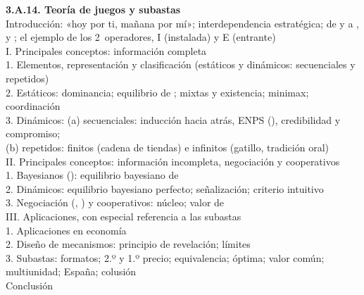 \documentclass[11pt]{article}
\begin{document}
\newpage
\begin{esquema}
\textbf{3.A.14. Teoría de juegos y subastas}\\[2pt]
Introducción: «hoy por ti, mañana por mí»; interdependencia estratégica; de  y  a ,  y ; el ejemplo de los 2~operadores, \textup{I} (instalada) y E (entrante)\\
I. Principales conceptos: información completa\\
\hspace*{1.5em}1. Elementos, representación y clasificación (estáticos y dinámicos: secuenciales y repetidos)\\
\hspace*{1.5em}2. Estáticos: dominancia; equilibrio de ; mixtas y existencia; minimax; coordinación\\
\hspace*{1.5em}3. Dinámicos: (a) secuenciales: inducción hacia atrás, ENPS (), credibilidad y compromiso;\\
\hspace*{3em}(b) repetidos: finitos (cadena de tiendas) e infinitos (gatillo, tradición oral)\\
II. Principales conceptos: información incompleta, negociación y cooperativos\\
\hspace*{1.5em}1. Bayesianos (): equilibrio bayesiano de \\
\hspace*{1.5em}2. Dinámicos: equilibrio bayesiano perfecto; señalización; criterio intuitivo\\
\hspace*{1.5em}3. Negociación (, ) y cooperativos: núcleo; valor de \\
III. Aplicaciones, con especial referencia a las subastas\\
\hspace*{1.5em}1. Aplicaciones en economía\\
\hspace*{1.5em}2. Diseño de mecanismos: principio de revelación; límites\\
\hspace*{1.5em}3. Subastas: formatos; 2.º y 1.º precio; equivalencia; óptima; valor común; multiunidad; España; colusión\\
Conclusión
\end{esquema}
\end{document}
